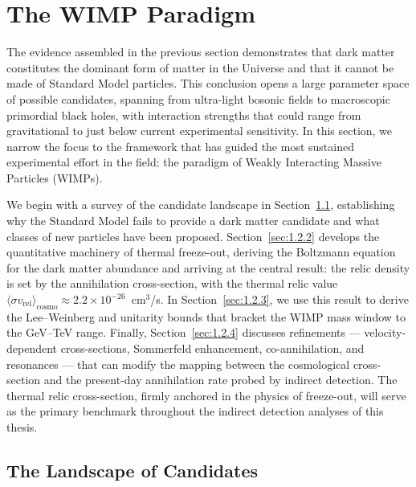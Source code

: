 
\section{The WIMP Paradigm}
\label{sec:1.2}

The evidence assembled in the previous section demonstrates that dark matter constitutes the dominant form of matter in the Universe and that it cannot be made of Standard Model particles.
This conclusion opens a large parameter space of possible candidates, spanning from ultra-light bosonic fields to macroscopic primordial black holes, with interaction strengths that could range from gravitational to just below current experimental sensitivity.
In this section, we narrow the focus to the framework that has guided the most sustained experimental effort in the field: the paradigm of Weakly Interacting Massive Particles (WIMPs).

We begin with a survey of the candidate landscape in Section~\ref{sec:1.2.1}, establishing why the Standard Model fails to provide a dark matter candidate and what classes of new particles have been proposed.
Section~\ref{sec:1.2.2} develops the quantitative machinery of thermal freeze-out, deriving the Boltzmann equation for the dark matter abundance and arriving at the central result: the relic density is set by the annihilation cross-section, with the thermal relic value $\langle \sigma v_\mathrm{rel} \rangle_\mathrm{cosmo} \approx 2.2 \times 10^{-26}$~cm$^3$/s.
In Section~\ref{sec:1.2.3}, we use this result to derive the Lee--Weinberg and unitarity bounds that bracket the WIMP mass window to the GeV--TeV range.
Finally, Section~\ref{sec:1.2.4} discusses refinements --- velocity-dependent cross-sections, Sommerfeld enhancement, co-annihilation, and resonances --- that can modify the mapping between the cosmological cross-section and the present-day annihilation rate probed by indirect detection.
The thermal relic cross-section, firmly anchored in the physics of freeze-out, will serve as the primary benchmark throughout the indirect detection analyses of this thesis.

\subsection{The Landscape of Candidates}
\label{sec:1.2.1}

